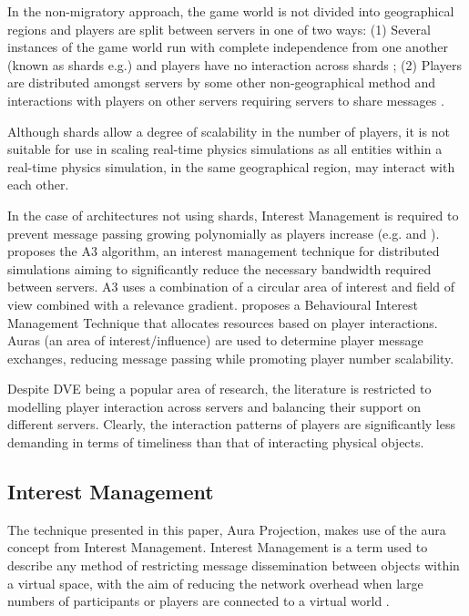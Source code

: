In the non-migratory approach, the game world is not divided into geographical regions and players are split between servers in one of two ways: (1) Several instances of the game world run with complete independence from one another (known as shards e.g.\cite{WOW}) and players have no interaction across shards \cite{P2PForMMOs}; (2) Players are distributed amongst servers by some other non-geographical method and interactions with players on other servers requiring servers to share messages \cite{LoadBalancingforMMOs}.

Although shards allow a degree of scalability in the number of players, it is not suitable for use in scaling real-time physics simulations as all entities within a real-time physics simulation, in the same geographical region, may interact with each other.

In the case of architectures not using shards, Interest Management is required to prevent message passing growing polynomially as players increase (e.g. \cite{Bezerra2008} and \cite{LoadBalancingforMMOs}).
\cite{Bezerra2008} proposes the A3 algorithm, an interest management technique for distributed simulations aiming to significantly reduce the necessary bandwidth required between servers. A3 uses a combination of a circular area of interest and field of view combined with a relevance gradient. \cite{LoadBalancingforMMOs} proposes a Behavioural Interest Management Technique that allocates resources based on player interactions. Auras (an area of interest/influence) are used to determine player message exchanges, reducing message passing while promoting player number scalability.

Despite DVE being a popular area of research, the literature is restricted to modelling player interaction across servers and balancing their support on different servers. Clearly, the interaction patterns of players are significantly less demanding in terms of timeliness than that of interacting physical objects.


\subsection{Interest Management}\label{InterestManagement}
The technique presented in this paper, Aura Projection, makes use of the aura concept from Interest Management. Interest Management is a term used to describe any method of restricting message dissemination between objects within a virtual space, with the aim of reducing the network overhead when large numbers of participants or players are connected to a virtual world \cite{Morgan2005}.


